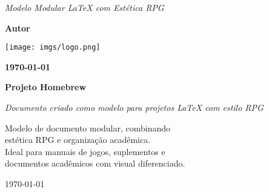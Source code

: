 
\begin{titlepage}
    \begin{center}
        \vspace*{2cm}
        
        
        \vspace{1cm}
        {\Large\textit{Modelo Modular LaTeX com Estética RPG}}
        
        \vfill
        
        \Large\textbf{Autor}
        
        \vspace{0.5cm}
        
        \texttt{[image: imgs/logo.png]}
        
        \vfill
        
        \large\textbf{\today}
    \end{center}
\end{titlepage}

\cleardoublepage

\thispagestyle{empty}
\begin{center}
    \vspace*{2cm}
    
    {\Huge\bfseries Projeto Homebrew}
    
    \vspace{2cm}
    
    {\large\textit{Documento criado como modelo para projetos LaTeX com estilo RPG}}
    
    \vfill
    
    \begin{flushright}
        \begin{minipage}{8cm}
            \singlespacing
            Modelo de documento modular, combinando\\ 
            estética RPG e organização acadêmica.\\
            Ideal para manuais de jogos, suplementos e\\
            documentos acadêmicos com visual diferenciado.
        \end{minipage}
    \end{flushright}
    
    \vfill
    
    \today
\end{center}

